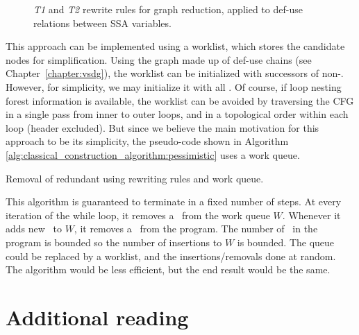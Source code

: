 {\begin{figure}
  \caption{\label{fig:t1t2transforms}\emph{T1} and \emph{T2} rewrite
  rules for graph reduction, applied to def-use relations between SSA 
  variables.}
\end{figure}

This approach can be implemented using a worklist, 
which stores the candidate nodes for simplification.
Using the graph made up of def-use chains (see Chapter~\ref{chapter:vsdg}), 
the worklist can be initialized with successors of non-\phifuns.
However, for simplicity, we may initialize it with all \phifuns.
Of course, if loop nesting forest
information is available, 
the worklist can be avoided by traversing the CFG in a single pass 
from inner to outer loops, and in a topological order within each loop (header excluded).
But since we believe the main motivation for this approach to be its
simplicity,
the pseudo-code shown in Algorithm 
\ref{alg:classical_construction_algorithm:pessimistic} uses a work queue.


\begin{algorithm}[h]
\caption{\label{alg:classical_construction_algorithm:pessimistic}
Removal of redundant \phifuns using rewriting rules and work queue.}
\end{algorithm}

This algorithm is guaranteed to terminate in a fixed number of steps.
At every iteration of the while loop, it removes a \phifun\ from the
work queue
$W$. Whenever it adds new \phifuns\ to $W$, it removes a \phifun\ from
the program.
The number of \phifuns\ in 
the program is bounded so the number of insertions to $W$ is bounded.
The queue could be replaced by a worklist, and the insertions/removals
done at random. The algorithm would be less efficient, but the
end result would be the same.

\section{Additional reading}
\label{sec:classical_construction_algorithm:reading}

}
